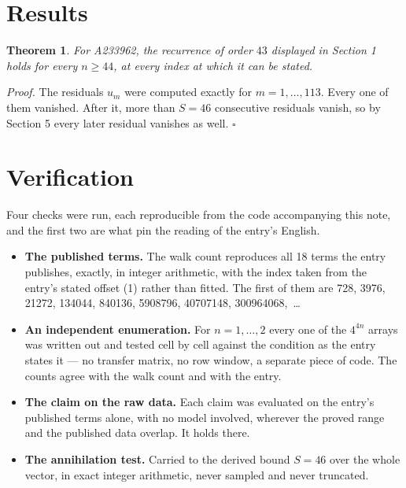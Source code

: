 \documentclass[11pt]{article}
\newtheorem{theorem}{Theorem}
\theoremstyle{definition}
\begin{document}
\section{Results}

\begin{theorem} For A233962, the recurrence of order $43$ displayed in Section 1 holds for every $n \ge 44$, at every index at which it can be stated.\end{theorem}

{\itshape Proof.} The residuals $u_m$ were computed exactly for $m = 1,\dots,113$. Every one of them vanished. After it, more than $S = 46$ consecutive residuals vanish, so by Section 5 every later residual vanishes as well. $\square$

\section{Verification}

Four checks were run, each reproducible from the code accompanying this note, and the first two are what pin the reading of the entry's English.

\begin{itemize}

\item {\bfseries The published terms.} The walk count reproduces all 18 terms the entry publishes, exactly, in integer arithmetic, with the index taken from the entry's stated offset (1) rather than fitted. The first of them are 728, 3976, 21272, 134044, 840136, 5908796, 40707148, 300964068,~\dots

\item {\bfseries An independent enumeration.} For $n = 1,\dots,2$ every one of the $4^{4n}$ arrays was written out and tested cell by cell against the condition as the entry states it --- no transfer matrix, no row window, a separate piece of code. The counts agree with the walk count and with the entry.

\item {\bfseries The claim on the raw data.} Each claim was evaluated on the entry's published terms alone, with no model involved, wherever the proved range and the published data overlap. It holds there.

\item {\bfseries The annihilation test.} Carried to the derived bound $S = 46$ over the whole vector, in exact integer arithmetic, never sampled and never truncated.

\end{itemize}
\end{document}
